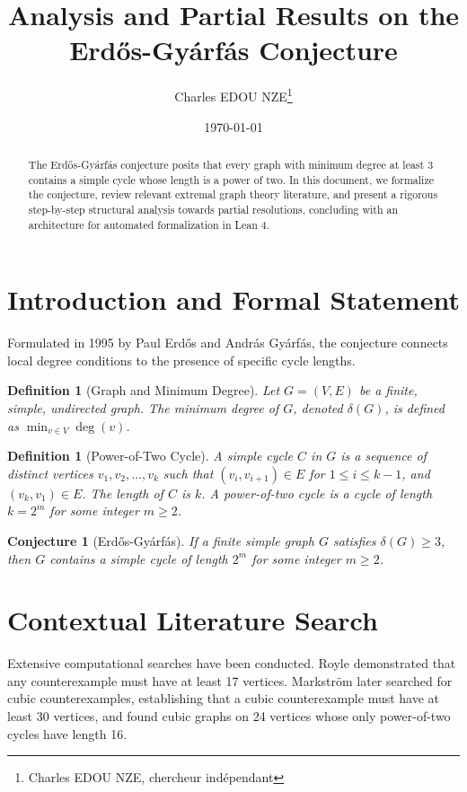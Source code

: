 \documentclass[11pt, a4paper]{article}
\title{Analysis and Partial Results on the Erd\H{o}s-Gy\'arf\'as Conjecture}
\author{Charles EDOU NZE\thanks{Charles EDOU NZE, chercheur ind\'ependant}}
\date{\today}
\newtheorem{conjecture}[theorem]{Conjecture}
\newtheorem{definition}[theorem]{Definition}
\begin{document}
\maketitle

\begin{abstract}
The Erd\H{o}s-Gy\'arf\'as conjecture posits that every graph with minimum degree at least 3 contains a simple cycle whose length is a power of two. In this document, we formalize the conjecture, review relevant extremal graph theory literature, and present a rigorous step-by-step structural analysis towards partial resolutions, concluding with an architecture for automated formalization in Lean 4.
\end{abstract}

\section{Introduction and Formal Statement}

Formulated in 1995 by Paul Erd\H{o}s and Andr\'as Gy\'arf\'as, the conjecture connects local degree conditions to the presence of specific cycle lengths.

\begin{definition}[Graph and Minimum Degree]
Let $G = (V, E)$ be a finite, simple, undirected graph. The minimum degree of $G$, denoted $\delta(G)$, is defined as $\min_{v \in V} \deg(v)$.
\end{definition}

\begin{definition}[Power-of-Two Cycle]
A simple cycle $C$ in $G$ is a sequence of distinct vertices $v_1, v_2, \dots, v_k$ such that $(v_i, v_{i+1}) \in E$ for $1 \le i \le k-1$, and $(v_k, v_1) \in E$. The length of $C$ is $k$. A power-of-two cycle is a cycle of length $k = 2^m$ for some integer $m \ge 2$.
\end{definition}

\begin{conjecture}[Erd\H{o}s-Gy\'arf\'as]
If a finite simple graph $G$ satisfies $\delta(G) \ge 3$, then $G$ contains a simple cycle of length $2^m$ for some integer $m \ge 2$.
\end{conjecture}

\section{Contextual Literature Search}

Extensive computational searches have been conducted. Royle demonstrated that any counterexample must have at least 17 vertices. Markstr\"om later searched for cubic counterexamples, establishing that a cubic counterexample must have at least 30 vertices, and found cubic graphs on 24 vertices whose only power-of-two cycles have length 16.
\end{document}
